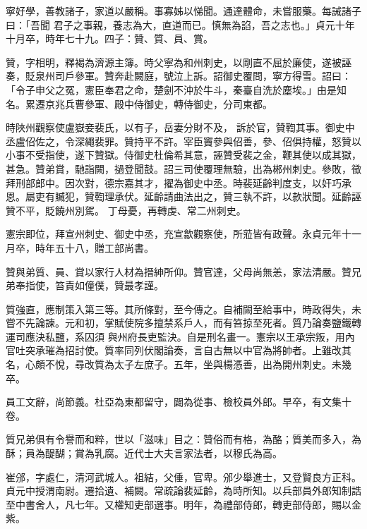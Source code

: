 \begin{pinyinscope}
 寧好學，善教諸子，家道以嚴稱。事寡姊以悌聞。通達體命，未嘗服藥。每誡諸子曰：「吾聞
 君子之事親，養志為大，直道而已。慎無為諂，吾之志也。」貞元十年十月卒，時年七十九。四子：贊、質、員、賞。



 贊，字相明，釋褐為濟源主簿。時父寧為和州刺史，以剛直不屈於廉使，遂被誣奏，貶泉州司戶參軍。贊奔赴闕庭，號泣上訴。詔御史覆問，寧方得雪。詔曰：「令子申父之冤，憲臣奉君之命，楚劍不沖於牛斗，秦臺自洗於塵埃。」由是知名。累遷京兆兵曹參軍、殿中侍御史，轉侍御史，分司東都。



 時陜州觀察使盧嶽妾裴氏，以有子，岳妻分財不及，
 訴於官，贊鞫其事。御史中丞盧佋佐之，令深繩裴罪。贊持平不許。宰臣竇參與佋善，參、佋俱持權，怒贊以小事不受指使，遂下贊獄。侍御史杜倫希其意，誣贊受裴之金，鞭其使以成其獄，甚急。贊弟賞，馳詣闕，撾登聞鼓。詔三司使覆理無驗，出為郴州刺史。參敗，徵拜刑部郎中。因次對，德宗嘉其才，擢為御史中丞。時裴延齡判度支，以奸巧承恩。屬吏有贓犯，贊鞫理承伏。延齡請曲法出之，贊三執不許，以款狀聞。延齡誣贊不平，貶饒州別駕。
 丁母憂，再轉虔、常二州刺史。



 憲宗即位，拜宣州刺史、御史中丞，充宣歙觀察使，所蒞皆有政聲。永貞元年十一月卒，時年五十八，贈工部尚書。



 贊與弟質、員、賞以家行人材為搢紳所仰。贊官達，父母尚無恙，家法清嚴。贊兄弟奉指使，笞責如僮僕，贊最孝謹。



 質強直，應制策入第三等。其所條對，至今傳之。自補闕至給事中，時政得失，未嘗不先論諫。元和初，掌賦使院多擅禁系戶人，而有笞掠至死者。質乃論奏鹽鐵轉運司應決私鹽，系囚須
 與州府長吏監決。自是刑名畫一。憲宗以王承宗叛，用內官吐突承璀為招討使。質率同列伏閣論奏，言自古無以中官為將帥者。上雖改其名，心頗不悅，尋改質為太子左庶子。五年，坐與楊憑善，出為開州刺史。未幾卒。



 員工文辭，尚節義。杜亞為東都留守，闢為從事、檢校員外郎。早卒，有文集十卷。



 質兄弟俱有令譽而和粹，世以「滋味」目之：贊俗而有格，為酪；質美而多入，為酥；員為醍醐；賞為乳腐。近代士大夫言家法者，以穆氏為高。



 崔邠，字處仁，清河武城人。祖結，父倕，官卑。邠少舉進士，又登賢良方正科。貞元中授渭南尉。遷拾遺、補闕。常疏論裴延齡，為時所知。以兵部員外郎知制誥至中書舍人，凡七年。又權知吏部選事。明年，為禮部侍郎，轉吏部侍郎，賜以金紫。




\end{pinyinscope}
